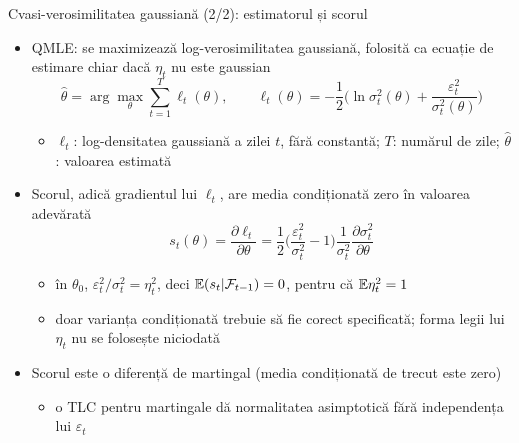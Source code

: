 \begin{frame}{Cvasi-verosimilitatea gaussiană (2/2): estimatorul și scorul}
\itemsize{\small}
\begin{itemize}
    \item QMLE: se maximizează log-verosimilitatea gaussiană, folosită ca ecuație de estimare chiar dacă $\eta_t$ nu este gaussian
    \[ \hat\theta = \arg\max_\theta \sum_{t=1}^T \ell_t(\theta), \qquad \ell_t(\theta) = -\frac12\Big(\ln\sigma^2_t(\theta) + \frac{\varepsilon_t^2}{\sigma^2_t(\theta)}\Big) \]
    \begin{itemize}
        \item $\ell_t$: log-densitatea gaussiană a zilei $t$, fără constantă; $T$: numărul de zile; $\hat\theta$: valoarea estimată
    \end{itemize}
    \item Scorul, adică gradientul lui $\ell_t$, are media condiționată zero în valoarea adevărată
    \[ s_t(\theta) = \frac{\partial\ell_t}{\partial\theta} = \frac12\Big(\frac{\varepsilon_t^2}{\sigma_t^2} - 1\Big)\frac{1}{\sigma^2_t}\frac{\partial\sigma^2_t}{\partial\theta} \]
    \begin{itemize}
        \item în $\theta_0$, $\varepsilon_t^2/\sigma_t^2 = \eta_t^2$, deci $\mathbb{E}(s_t | \mathcal F_{t-1}) = 0$, pentru că $\mathbb{E}\eta_t^2 = 1$
        \item doar varianța condiționată trebuie să fie corect specificată; forma legii lui $\eta_t$ nu se folosește niciodată
    \end{itemize}
    \item Scorul este o diferență de martingal (media condiționată de trecut este zero)
    \begin{itemize}
        \item o TLC pentru martingale dă normalitatea asimptotică fără independența lui $\varepsilon_t$
    \end{itemize}
\end{itemize}
\end{frame}

